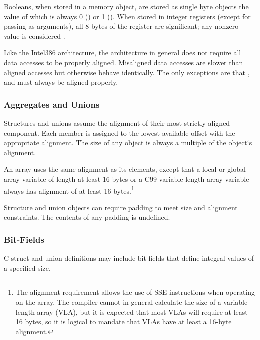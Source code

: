 Booleans, when stored in a memory object, are stored as
single byte objects the value of which is always 0 () or 1
().  When stored in integer registers (except for passing
as arguments), all 8 bytes of the register are significant;
any nonzero value is considered .

Like the Intel386 architecture, the \xARCH architecture in general
does not require all data accesses to be properly aligned.  Misaligned
data accesses are slower than aligned accesses
but otherwise behave identically.  The only exceptions are that
,  and  must always be aligned
properly.

\subsubsection{Aggregates and Unions}

Structures and unions assume the alignment of their most strictly
aligned component.  Each member is assigned to the lowest available
offset with the appropriate alignment.  The size of any object is always
a multiple of the object`s alignment.

An array uses the same alignment as its elements, except that a local
or global array variable of length at least 16 bytes or a C99
variable-length array variable always has alignment
of at least 16 bytes.\footnote{The alignment requirement allows the
  use of SSE instructions when operating on the array.  The compiler
  cannot in general calculate the size of a variable-length array (VLA), but
  it is expected that most VLAs will require at least 16 bytes, so it
  is logical to mandate that VLAs have at least a 16-byte alignment.}

Structure and union objects can require padding to meet size and
alignment constraints.  The contents of any padding is undefined.


\subsubsection{Bit-Fields}

C struct and union definitions may include bit-fields that define
integral values of a specified size.

